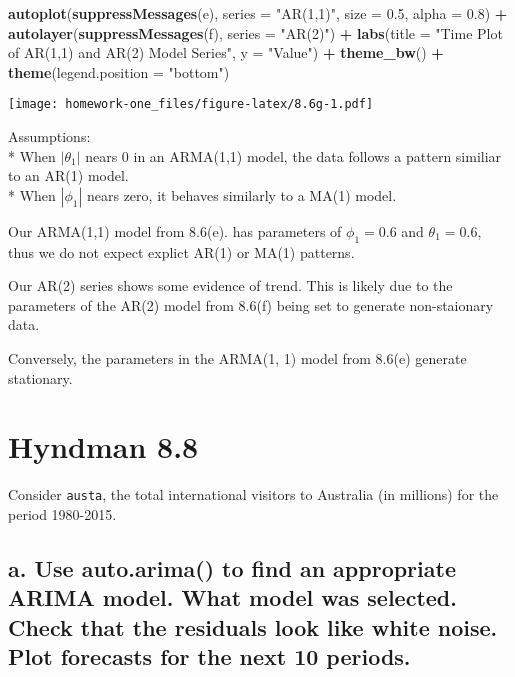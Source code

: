 \documentclass[openany]{book}
\newenvironment{Shaded}{\begin{snugshade}}{\end{snugshade}}
\newcommand{\DataTypeTok}[1]{\textcolor[rgb]{0.13,0.29,0.53}{#1}}
\newcommand{\FloatTok}[1]{\textcolor[rgb]{0.00,0.00,0.81}{#1}}
\newcommand{\KeywordTok}[1]{\textcolor[rgb]{0.13,0.29,0.53}{\textbf{#1}}}
\newcommand{\NormalTok}[1]{#1}
\newcommand{\OperatorTok}[1]{\textcolor[rgb]{0.81,0.36,0.00}{\textbf{#1}}}
\newcommand{\StringTok}[1]{\textcolor[rgb]{0.31,0.60,0.02}{#1}}
\begin{document}
\begin{Shaded}
\begin{Highlighting}[]
\KeywordTok{autoplot}\NormalTok{(}\KeywordTok{suppressMessages}\NormalTok{(e), }\DataTypeTok{series =} \StringTok{"AR(1,1)"}\NormalTok{, }\DataTypeTok{size =} \FloatTok{0.5}\NormalTok{, }
  \DataTypeTok{alpha =} \FloatTok{0.8}\NormalTok{) }\OperatorTok{+}\StringTok{ }\KeywordTok{autolayer}\NormalTok{(}\KeywordTok{suppressMessages}\NormalTok{(f), }\DataTypeTok{series =} \StringTok{"AR(2)"}\NormalTok{) }\OperatorTok{+}\StringTok{ }
\StringTok{  }\KeywordTok{labs}\NormalTok{(}\DataTypeTok{title =} \StringTok{"Time Plot of AR(1,1) and AR(2) Model Series"}\NormalTok{, }
    \DataTypeTok{y =} \StringTok{"Value"}\NormalTok{) }\OperatorTok{+}\StringTok{ }\KeywordTok{theme_bw}\NormalTok{() }\OperatorTok{+}\StringTok{ }\KeywordTok{theme}\NormalTok{(}\DataTypeTok{legend.position =} \StringTok{"bottom"}\NormalTok{)}
\end{Highlighting}
\end{Shaded}

\texttt{[image: homework-one\_files/figure-latex/8.6g-1.pdf]}

Assumptions:\\
* When \(|\theta_1|\) nears 0 in an ARMA(1,1) model, the data follows a pattern similiar to an AR(1) model.\\
* When \(|\phi_1|\) nears zero, it behaves similarly to a MA(1) model.

Our ARMA(1,1) model from 8.6(e). has parameters of \(\phi_1=0.6\) and \(\theta_1=0.6\), thus we do not expect explict AR(1) or MA(1) patterns.

Our AR(2) series shows some evidence of trend. This is likely due to the parameters of the AR(2) model from 8.6(f) being set to generate non-staionary data.

Conversely, the parameters in the ARMA(1, 1) model from 8.6(e) generate stationary.

\hypertarget{hyndman-8.8}{%
\section{Hyndman 8.8}\label{hyndman-8.8}}

Consider \texttt{austa}, the total international visitors to Australia (in millions) for the period 1980-2015.

\hypertarget{a.-use-auto.arima-to-find-an-appropriate-arima-model.-what-model-was-selected.-check-that-the-residuals-look-like-white-noise.-plot-forecasts-for-the-next-10-periods.}{%
\subsection{a. Use auto.arima() to find an appropriate ARIMA model. What model was selected. Check that the residuals look like white noise. Plot forecasts for the next 10 periods.}\label{a.-use-auto.arima-to-find-an-appropriate-arima-model.-what-model-was-selected.-check-that-the-residuals-look-like-white-noise.-plot-forecasts-for-the-next-10-periods.}}
\end{document}
